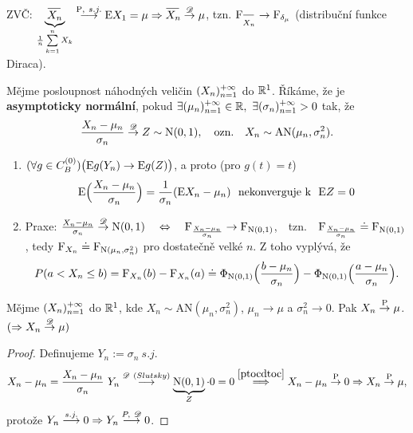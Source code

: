 \begin{remark}
	ZVČ: $\underbrace{\oxn }_{\frac{1}{n}\suminftykn X_k}\stackrel{\PP,~s.j.}{\longrightarrow}\E  X_1=\mu\Rightarrow\oxn \Dto \mu$, tzn. $\FF_{\oxn }\to \FF_{\delta_\mu}$ (distribuční funkce Diraca).
\end{remark}
\begin{define}
	Mějme posloupnost náhodných veličin $(X_n)_{n=1}^{+\infty}$ do $\mathbb{R}^1$. Říkáme, že je\textbf{ asymptoticky normální}, pokud $\exists (\mu_n)_{n=1}^{+\infty} \in\mathbb{R},~\exists (\sigma_n)_{n=1}^{+\infty}>0$ tak, že 
	$$ \frac{X_n-\mu_n}{\sigma_n}\stackrel{\mathscr{D}}{\to} Z\sim \mathrm{N}(0,1),\text{~~~ozn.~~~}X_n\sim \mathrm{AN}(\mu_n,\sigma_n^2). $$
\end{define}
\begin{remark}\begin{enumerate}
		\item $(\forall g\in C_B^{(0)})\bigl( \mathrm{E}  g(Y_n)\to \mathrm{E}  g(Z) \bigr)$, a proto (pro $g(t)=t$)
		$$ \mathrm{E} \Bigl( \frac{X_n-\mu_n}{\sigma_n} \Bigr)=\frac{1}{\sigma_n}(\mathrm{E}  X_n-\mu_n)\text{~~nekonverguje k~~}\mathrm{E}  Z=0 $$	
		\item Praxe: $\frac{X_n-\mu_n}{\sigma_n}\stackrel{\mathscr{D}}{\to} \mathrm{N}(0,1)~~~\Leftrightarrow~~~ \mathrm{F}_{\frac{X_n-\mu_n}{\sigma_n}}\to \mathrm{F}_{\mathrm{N}(0,1)}$,~~tzn.~~$\mathrm{F}_{\frac{X_n-\mu_n}{\sigma_n}}\doteq \mathrm{F}_{\mathrm{N}(0,1)}$, tedy $\mathrm{F}_{X_n}\doteq \mathrm{F}_{\mathrm{N}(\mu_n,\sigma_n^2)}$ pro dostatečně velké $n$. Z toho vyplývá, že 
		$$ P(a<X_n\leq b)=\mathrm{F}_{X_n}(b)-\mathrm{F}_{X_n}(a) \doteq \Phi_{\mathrm{N}(0,1)}\Bigl( \frac{b-\mu_n}{\sigma_n} \Bigr)-\Phi_{\mathrm{N}(0,1)}\Bigl( \frac{a-\mu_n}{\sigma_n} \Bigr). $$
	\end{enumerate}
\end{remark}
\begin{theorem}
	Mějme $(X_n)_{n=1}^{+\infty}$ do $\mathbb{R}^1$, kde $X_n\sim \mathrm{AN}(\mu_n,\sigma_n^2)$, $\mu_n\to\mu$ a $\sigma_n^2\to 0$. Pak $X_n\stackrel{\mathrm{P}}{\to} \mu$. $(\Rightarrow X_n\stackrel{\mathscr{D}}{\to} \mu)$
	\begin{proof} Definujeme $Y_n:=\sigma_n~s.j.$
		$$ X_n-\mu_n=\frac{X_n-\mu_n}{\sigma_n}~Y_n\stackrel{\mathscr{D}~(Slutsky)}{\longrightarrow} \underbrace{\mathrm{N}(0,1)}_{Z}\cdot 0 = 0 \stackrel{\ref{ptocdtoc}}{\Longrightarrow}X_n-\mu_n\stackrel{\mathrm{P}}{\to} 0\Rightarrow X_n\stackrel{\mathrm{P}}{\to} \mu ,$$ protože $Y_n\stackrel{s.j.}{\longrightarrow} 0\Rightarrow Y_n\stackrel{P,~\mathscr{D}}{\longrightarrow}0$.
	\end{proof}
\end{theorem}

